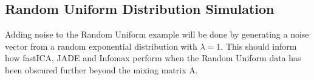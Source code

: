 \documentclass[12pt,twoside]{amherstthesis}
\begin{document}
  \subsection{Random Uniform Distribution
  Simulation}\label{random-uniform-distribution-simulation}
  
  Adding noise to the Random Uniform example will be done by generating a
  noise vector from a random exponential distribution with \(\lambda= 1\).
  This should inform how fastICA, JADE and Infomax perform when the Random
  Uniform data has been obscured further beyond the mixing matrix A.
  
  \begin{Shaded}
  \begin{Highlighting}[]
  \StringTok{ }
  \NormalTok{(}\NormalTok{)}
  \StringTok{ }
  \StringTok{ }\NormalTok{,}\NormalTok{)}
  \StringTok{ }\NormalTok{(}
  \StringTok{ }\NormalTok{) }
  \StringTok{ }\NormalTok{(}\NormalTok{)}
     \OperatorTok{:}
      \OperatorTok{<}
  \StringTok{ }
  
  \NormalTok{    \}}\NormalTok{ \{}
  \StringTok{ }
  
  \NormalTok{  \}}
  \StringTok{ }\NormalTok{,}
    
  \NormalTok{\}}
  \end{Highlighting}
  \end{Shaded}
  
\end{document}

